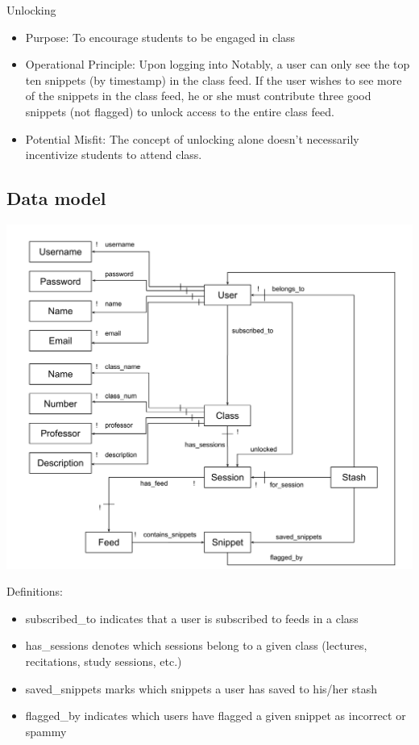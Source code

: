 \documentclass{article}
\begin{document}
Unlocking
\begin{itemize}
\item Purpose: To encourage students to be engaged in class
\item Operational Principle: Upon logging into Notably, a user can only see the top ten snippets (by timestamp) in the class feed. If the user wishes to see more of the snippets in the class feed, he or she must contribute three good snippets (not flagged) to unlock access to the entire class feed.
\item Potential Misfit: The concept of unlocking alone doesn't necessarily incentivize students to attend class.
\end{itemize}

\subsection*{Data model}
\begin{center}
\includegraphics[width=6in]{DataModel.png}
\end{center}

Definitions:
\begin{itemize}
\item subscribed\_to indicates that a user is subscribed to feeds in a class
\item has\_sessions denotes which sessions belong to a given class (lectures, recitations, study sessions, etc.)
\item saved\_snippets marks which snippets a user has saved to his/her stash
\item flagged\_by indicates which users have flagged a given snippet as incorrect or spammy
\end{itemize}
\end{document}
